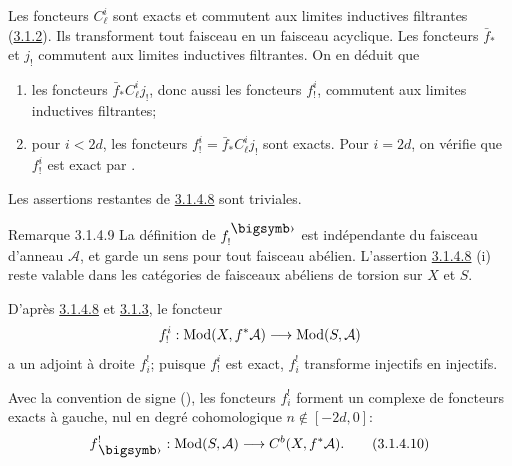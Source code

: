 \documentclass[10pt]{../fichiers-configuration-latex/smfart}
\begin{document}
Les foncteurs $C^{i}_{\ell}$ sont exacts et commutent aux limites
inductives filtrantes (\hyperref[XVIII.subsubsec3.1.2]{3.1.2}). Ils transforment
tout faisceau en un faisceau acyclique. Les foncteurs $\bar{f}_{\ast}$
et $j_{!}$ commutent aux limites inductives filtrantes. On en déduit que
\begin{enumerate}
\renewcommand{\theenumi}{\alph{enumi}}
\renewcommand{\labelenumi}{\theenumi)}
\item les foncteurs $\bar{f}_{\ast}C^{i}_{\ell}j_{!}$, donc aussi les
foncteurs $f^{i}_{!}$, commutent aux limites inductives filtrantes;

\item pour $i<2d$, les foncteurs
$f^{i}_{!}=\bar{f}_{\ast}C^{i}_{\ell}j_{!}$ sont exacts. Pour $i=2d$,
on vérifie que $f^{i}_{!}$ est exact par .
\end{enumerate}

Les assertions restantes de \hyperref[XVIII.lem3.1.4.8]{3.1.4.8} sont triviales.

\begin{enonce*}[remark]{Remarque 3.1.4.9}
La définition de $f^{\bigdot}_{!}$ est indépendante du faisceau
d'anneau $\mathcal{A}$, et garde un sens pour tout faisceau
abélien. L'assertion \hyperref[XVIII.lem3.1.4.8]{3.1.4.8} (i) reste valable dans les
catégories de faisceaux abéliens de torsion sur $X$ et $S$.
\end{enonce*}

D'après \hyperref[XVIII.lem3.1.4.8]{3.1.4.8} et \hyperref[XVIII.lem3.1.3]{3.1.3}, le foncteur
$$
f^{i}_{!}:\operatorname{Mod}(X,f^{\ast}\mathcal{A})\longrightarrow
\operatorname{Mod}(S,\mathcal{A})
$$
a un adjoint à droite $f^{!}_{i}$; puisque $f^{i}_{!}$ est exact,
$f^{!}_{i}$ transforme injectifs en injectifs.

Avec la convention de signe (), les foncteurs $f^{!}_{i}$
forment un complexe de foncteurs exacts à gauche, nul en degré
cohomologique $n\not\in [-2d,0]$:
\begin{equation*}
f^{!}_{\bigdot}:\Mod(S,\mathcal{A})\longrightarrow
C^{b}(X,f^{\ast}\mathcal{A}){\quoi}.\tag{3.1.4.10}
\end{equation*}
\end{document}
